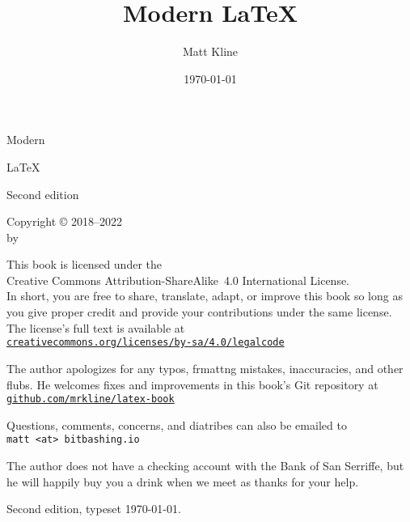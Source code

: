 \documentclass[fontsize=11bp, numbers=endperiod, draft=false]{scrbook}
\title{Modern \texorpdfstring{\LaTeX}{LaTeX}}
\author{Matt Kline}
\date{\today}
\makeatletter
\newcommand{\https}[1]{\href{https://#1}{\texttt{#1}}}
\newcommand{\edition}{Second edition}
\let\runauthor\@author
\makeatother
\begin{document}
\fontsize{11bp}{13bp}\selectfont

\frontmatter
\setcounter{secnumdepth}{0}
\setlength\parindent{0pt}

{}
\vspace*{1in}
\begin{center}
\fontsize{0.5in}{0.7in}\selectfont
Modern

\fontsize{1in}{0.9in}\selectfont
\LaTeX

\normalsize
\vspace{1.5\baselineskip}
\edition
\vspace{2in}

\LARGE
\runauthor
\end{center}
\clearpage

{\raggedright%
\null
\vfill
{
Copyright © 2018--2022 \\
by \runauthor
\bigskip

This book is licensed under the \\
Creative Commons Attribution-ShareAlike~4.0 International License. \\
In short, you are free to share, translate, adapt, or improve this book
so long as you give proper credit and provide your contributions under
the same license. \\
The license's full text is available at \\
\https{creativecommons.org/licenses/by-sa/4.0/legalcode}
}
\vfill

The author apologizes for any typos,
f\raisebox{-0.1ex}{o}rmatt\raisebox{0.1ex}{i}ng mistakes,
inaccuracies,
and other flubs.
He welcomes fixes and improvements in this book's Git repository at \\
\https{github.com/mrkline/latex-book}

\vspace{\baselineskip}
Questions, comments, concerns, and diatribes can also be emailed to \\
\texttt{matt <at> bitbashing.io}

\vspace{\baselineskip}
The author does not have a checking account with the Bank of San Serriffe,
but he will happily buy you a drink when we meet as thanks for your help.

\vspace{0.5in}
\edition, typeset \today.
} %
\clearpage
\end{document}
